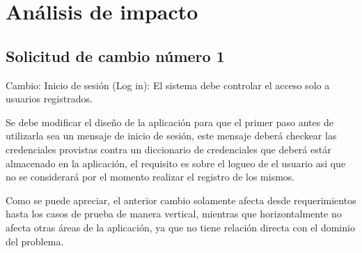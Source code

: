 \chapter{Análisis de impacto}

\section{Solicitud de cambio número 1}
Cambio: Inicio de sesión (Log in): El sistema debe controlar el acceso solo a usuarios
registrados.

Se debe modificar el diseño de la aplicación para que el primer paso antes de utilizarla sea un mensaje de inicio de sesión, este mensaje deberá checkear las credenciales provistas contra un diccionario de credenciales que deberá estár almacenado en la aplicación, el requisito es sobre el logueo de el usuario asi que no se considerará por el momento realizar el registro de los mismos.


Como se puede apreciar, el anterior cambio solamente afecta desde requerimientos hasta los casos de prueba de manera vertical, mientras que horizontalmente no afecta otras áreas de la aplicación, ya que no tiene relación directa con el dominio del problema.

